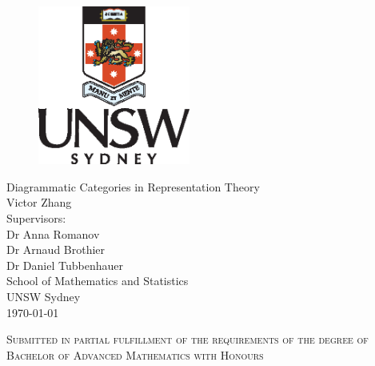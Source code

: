 \documentclass[12pt]{report}
\begin{document}
\thispagestyle{empty} %
\begin{figure} \begin{center}
    \includegraphics[width=5cm]{start-files/2022-01-portraitcolourpos.eps}
    \end{center} \end{figure}
\vspace*{\fill}
\begin{center}
    {\LARGE
    Diagrammatic Categories in Representation Theory\\
    }
    \vspace{4em}
    {\large
    Victor Zhang\\
    }
    \vspace{1.5em}
    {\large
    {\normalsize Supervisors:}\\Dr Anna Romanov\\Dr Arnaud Brothier\\Dr Daniel Tubbenhauer\\
    }
    \vspace{2em}
    School of Mathematics and Statistics\\UNSW Sydney
    \\ \vspace{3em}
    \monthyeardate\today
\end{center}
\vspace*{\fill}
\begin{center}
    \small\textsc{Submitted in partial fulfillment of the
    requirements of the degree of \\
    Bachelor of Advanced Mathematics with Honours}
\end{center}



\tableofcontents
\thispagestyle{empty}
\clearpage
\setcounter{page}{1}








\renewcommand{\bibname}{References}
\printbibliography[heading=bibintoc]
\end{document}

